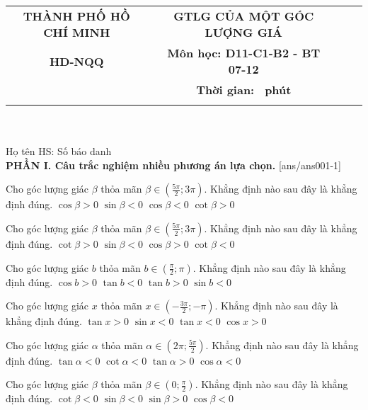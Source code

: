 \documentclass[12pt,a4paper]{article}
\newcommand{\tenso}{THÀNH PHỐ HỒ CHÍ MINH}
\newcommand{\tentruong}{HD-NQQ}
\newcommand{\tenkythi}{GTLG CỦA MỘT GÓC LƯỢNG GIÁ}
\newcommand{\tenmonthi}{Môn học: D11-C1-B2 - BT 07-12}
\newcommand{\thoigian}{}
\newcommand{\tieude}[1]{
   \begin{tabular}{cm{1cm}cm{3cm}cm{3cm}}
    {\bf \tenso} & & {\bf \tenkythi} \\
    {\bf \tentruong} & & {\bf \tenmonthi}\\
    && {\bf Thời gian: \bf \thoigian \, phút}\\
    && { \fbox{\bf Mã đề: #1}}
   \end{tabular}\\\\
    
   {Họ tên HS: \dotfill Số báo danh \dotfill}\\
}
\newcommand{\chantrang}[2]{\rfoot{Trang \thepage $-$ Mã đề #2}}
\begin{document}


\tieude{001}
\setcounter{page}{1}
{\bf PHẦN I. Câu trắc nghiệm nhiều phương án lựa chọn.}
\setcounter{ex}{0}
[ans/ans001-1]
\begin{ex}
 Cho góc lượng giác ${\beta}$ thỏa mãn $\beta\in \left( \frac{5 \pi}{2};3\pi \right)$. Khẳng định nào sau đây là khẳng định đúng. 
\choice
{ $\cos \beta >0$  }
   { $\sin \beta <0$  }
     { \True $\cos \beta <0$  }
    { $\cot \beta >0$  }
\end{ex}

\begin{ex}
 Cho góc lượng giác ${\beta}$ thỏa mãn $\beta\in \left( \frac{5 \pi}{2};3\pi \right)$. Khẳng định nào sau đây là khẳng định đúng. 
\choice
{ $\cot \beta >0$  }
   { $\sin \beta <0$  }
     { $\cos \beta >0$  }
    { \True $\cot \beta <0$  }
\end{ex}

\begin{ex}
 Cho góc lượng giác ${b}$ thỏa mãn $b\in \left( \frac{\pi}{2};\pi \right)$. Khẳng định nào sau đây là khẳng định đúng. 
\choice
{ $\cos b >0$  }
   { \True $\tan b <0$  }
     { $\tan b >0$  }
    { $\sin b <0$  }
\end{ex}

\begin{ex}
 Cho góc lượng giác ${x}$ thỏa mãn $x\in \left( - \frac{3 \pi}{2};- \pi \right)$. Khẳng định nào sau đây là khẳng định đúng. 
\choice
{ $\tan x >0$  }
   { $\sin x <0$  }
     { \True $\tan x <0$  }
    { $\cos x >0$  }
\end{ex}

\begin{ex}
 Cho góc lượng giác ${\alpha}$ thỏa mãn $\alpha\in \left( 2\pi;\frac{5 \pi}{2} \right)$. Khẳng định nào sau đây là khẳng định đúng. 
\choice
{ $\tan \alpha <0$  }
   { $\cot \alpha <0$  }
     { \True $\tan \alpha >0$  }
    { $\cos \alpha <0$  }
\end{ex}

\begin{ex}
 Cho góc lượng giác ${\beta}$ thỏa mãn $\beta\in \left( 0;\frac{\pi}{2} \right)$. Khẳng định nào sau đây là khẳng định đúng. 
\choice
{ $\cot \beta <0$  }
   { $\sin \beta <0$  }
     { \True $\sin \beta >0$  }
    { $\cos \beta <0$  }
\end{ex}
\end{document}
